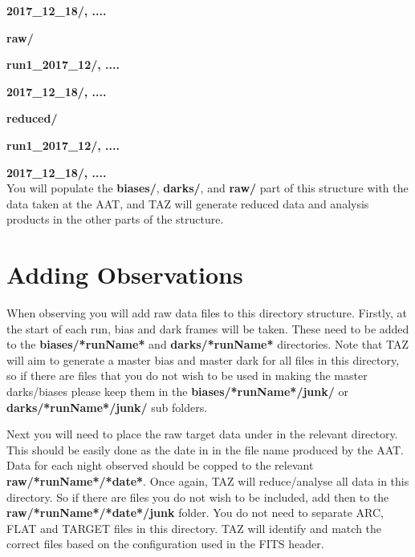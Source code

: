 \documentclass[12pt]{article}
\begin{document}
\hspace{20mm} \textbf{2017\_12\_18/, ....}
\vspace{1mm}

\hspace{10mm} \textbf{raw/} 
\vspace{1mm}

\hspace{15mm} \textbf{run1\_2017\_12/, ....} 
\vspace{1mm}

\hspace{20mm} \textbf{2017\_12\_18/, ....} 
\vspace{1mm}

\hspace{10mm} \textbf{reduced/}
\vspace{1mm}

\hspace{15mm} \textbf{run1\_2017\_12/, ....} 
\vspace{1mm}

\hspace{20mm} \textbf{2017\_12\_18/, ....} \\

You will populate the \textbf{biases/}, \textbf{darks/}, and \textbf{raw/} part of this structure with the data taken at the AAT, and TAZ will generate reduced data and analysis products in the other parts of the structure. 


\section{Adding Observations}

When observing you will add raw data files to this directory structure. Firstly, at the start of each run, bias and dark frames will be taken. These need to be added to the \textbf{biases/*runName*} and \textbf{darks/*runName*} directories. Note that TAZ will aim to generate a master bias and master dark for all files in this directory, so if there are files that you do not wish to be used in making the master darks/biases please keep them in the  \textbf{biases/*runName*/junk/} or \textbf{darks/*runName*/junk/} sub folders.

Next you will need to place the raw target data under in the relevant directory. This should be easily done as the date in in the file name produced by the AAT. Data for each night observed should be copped to the relevant \textbf{raw/*runName*/*date*}. Once again, TAZ will reduce/analyse all data in this directory. So if there are files you do not wish to be included, add then to the \textbf{raw/*runName*/*date*/junk} folder. You do not need to separate ARC, FLAT and TARGET files in this directory. TAZ will identify and match the correct files based on the configuration used in the FITS header.    
\end{document}
